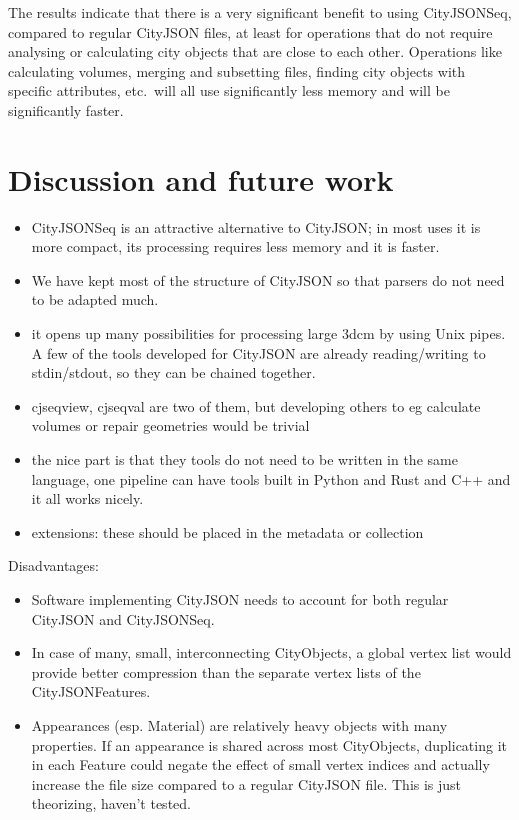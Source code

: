 \documentclass{isprs} %
\begin{document}
The results indicate that there is a very significant benefit to using CityJSONSeq, compared to regular CityJSON files, at least for operations that do not require analysing or calculating city objects that are close to each other.
Operations like calculating volumes, merging and subsetting files, finding city objects with specific attributes, etc.\ will all use significantly less memory and will be significantly faster.


%
\section{Discussion and future work}%
\label{sec:discussion}

\begin{itemize}
  \item CityJSONSeq is an attractive alternative to CityJSON; in most uses it is more compact, its processing requires less memory and it is faster.
  \item We have kept most of the structure of CityJSON so that parsers do not need to be adapted much.
  \item it opens up many possibilities for processing large 3dcm by using Unix pipes. A few of the tools developed for CityJSON are already reading/writing to stdin/stdout, so they can be chained together.
  \item cjseqview, cjseqval are two of them, but developing others to eg calculate volumes or repair geometries would be trivial
  \item the nice part is that they tools do not need to be written in the same language, one pipeline can have tools built in Python and Rust and C++ and it all works nicely.
  \item extensions: these should be placed in the metadata or collection
\end{itemize}

Disadvantages:
\begin{itemize}
  \item  Software implementing CityJSON needs to account for both regular CityJSON and CityJSONSeq.
  \item  In case of many, small, interconnecting CityObjects, a global vertex list would provide better compression than the separate vertex lists of the CityJSONFeatures.
  \item  Appearances (esp. Material) are relatively heavy objects with many properties. If an appearance is shared across most CityObjects, duplicating it in each Feature could negate the effect of small vertex indices and actually increase the file size compared to a regular CityJSON file. This is just theorizing, haven't tested.
\end{itemize}


{
	\begin{spacing}{1.17}
		\normalsize
	\end{spacing}
}
\end{document}
